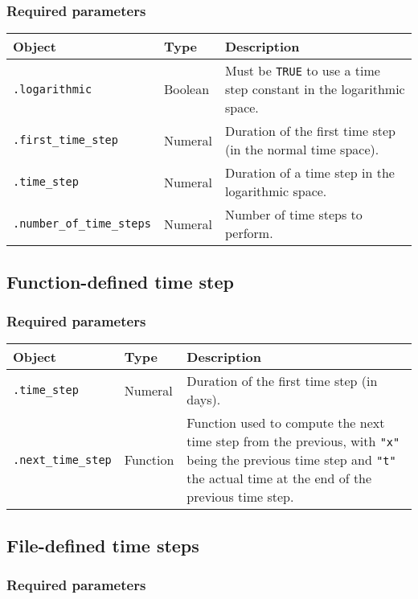 \documentclass[10pt]{article}
\begin{document}
\subsubsection*{Required parameters}

\begin{tabularx}{\textwidth}{llX}
\hline 
Object & Type & Description \\ 
\hline 
\verb+.logarithmic+ & Boolean & Must be \verb+TRUE+ to use a time step constant in the logarithmic space. \\ 
\verb+.first_time_step+ & Numeral & Duration of the first time step (in the normal time space). \\ 
\verb+.time_step+ & Numeral & Duration of a time step in the logarithmic space. \\ 
\verb+.number_of_time_steps+ & Numeral & Number of time steps to perform.\\
\hline 
\end{tabularx}

\subsection{Function-defined time step}

\subsubsection*{Required parameters}

\begin{tabularx}{\textwidth}{llX}
\hline 
Object & Type & Description \\ 
\hline 
\verb+.time_step+ & Numeral & Duration of the first time step (in days). \\ 
\verb+.next_time_step+ & Function & Function used to compute the next time step from the previous, with \verb+"x"+ being the previous time step and \verb+"t"+ the actual time at the end of the previous time step. \\ 
\hline 
\end{tabularx}

\subsection{File-defined time steps}

\subsubsection*{Required parameters}
\end{document}
